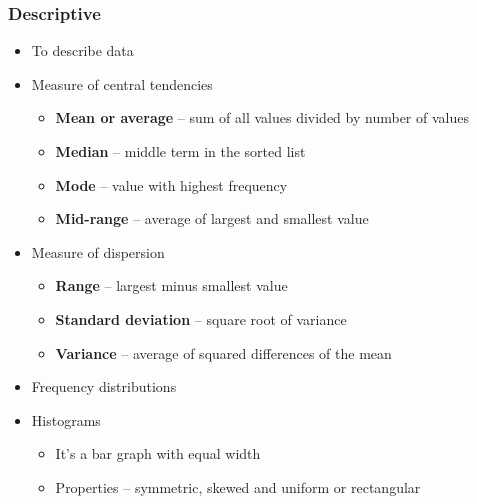 \documentclass[tiles]{cornellnotes}
\begin{document}
\begin{cuenotes}
{                        \subsubsection*{Descriptive}
                        \begin{itemize}
                                \item To describe data
                                \item Measure of central tendencies
                                \begin{itemize}
                                        \item \textbf{Mean or average} -- sum of all values divided by number of values
                                        \item \textbf{Median} -- middle term in the sorted list
                                        \item \textbf{Mode} -- value with highest frequency
                                        \item \textbf{Mid-range} -- average of largest and smallest value
                                \end{itemize}
                                \item Measure of dispersion
                                \begin{itemize}
                                        \item \textbf{Range} -- largest minus smallest value
                                        \item \textbf{Standard deviation} -- square root of variance
                                        \item \textbf{Variance} -- average of squared differences of the mean
                                \end{itemize}
                                \item Frequency distributions
                                \item Histograms
                                \begin{itemize}
                                        \item It's a bar graph with equal width
                                        \item Properties -- symmetric, skewed and uniform or rectangular
                                \end{itemize}
                        \end{itemize}
                }
                \note{
}
\end{cuenotes}
\end{document}
